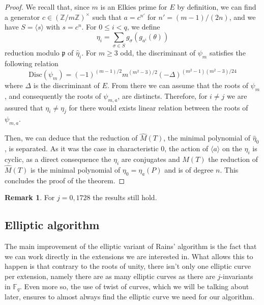 \documentclass[12pt]{article}
\theoremstyle{plain}
\theoremstyle{definition}
\newtheorem*{remark}{Remark}
\def\Z{\ensuremath{\mathbb{Z}}}
\def\F{\ensuremath{\mathbb{F}}}
\newcounter{algorithm}
\begin{document}
\begin{proof}
We recall that, since $m$ is an Elkies prime for $E$ by definition, we can 
find a generator $c\in(\Z/m\Z)^{\times}$ such that $a = c^{n'}$ for 
$n'=(m-1)/(2n)$, and we have $S=\langle{s}\rangle$ with $s=c^n$. 
For $0\leq i<q$, we define 
\begin{equation}
\eta_i = \sum_{\sigma\in S}{g_{\sigma}(g_{a^i}(\theta))}
\end{equation}
reduction modulo $\mathfrak{p}$ of $\widehat{\eta}_i$. For $m\geq3$ odd, the
discriminant of $\psi_m$ satisfies the following relation
\begin{equation}
\text{Disc}(\psi_m) = (-1)^{(m-1)/2}m^{(m^2 - 3)/2}(-\Delta)^{(m^2 - 1)(m^2 -
3)/24}
\end{equation}
where $\Delta$ is the discriminant of $E$. From there we can assume that the
roots of $\psi_m$, and consequently the roots of $\psi_{m,a}$, are
distincts. Therefore, for $i\neq j$ we are assured that $\eta_i\neq\eta_j$ for
there would exists linear relation between the roots of $\psi_{m,a}$.

Then, we can deduce that the reduction of $\widehat{M}(T)$, the minimal
polynomial of $\widehat{\eta}_0$, is separated. As it was the case in
characteristic $0$, the action of $\langle{a}\rangle$ on the $\eta_i$ is cyclic,
as a direct consequence the $\eta_i$ are conjugates and $M(T)$ the reduction of
$\widehat{M}(T)$ is the minimal polynomial of $\eta_0 = \eta_a(P)$ and is of
degree $n$. This concludes the proof of the theorem.

\end{proof}

\begin{remark}
For $j=0,1728$ the results still hold. %
\end{remark}

\subsection{Elliptic algorithm}

The main improvement of the elliptic variant of Rains' algorithm is the fact
that we can work directly in the extensions we are interested in. What allows
this to happen is that contrary to the roots of unity, there isn't only one
elliptic curve per extension, namely there are as many elliptic curves as there
are $j$-invariants in $\F_q$. Even more so, the use of twist of curves, which we
will be talking about later, ensures to almost always find the elliptic curve we
need for our algorithm.
\end{document}
